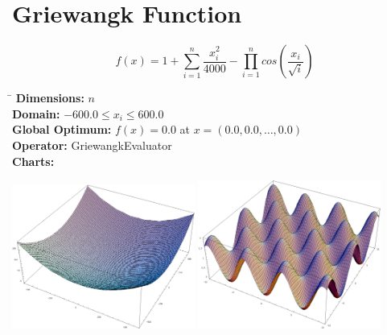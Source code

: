 \documentclass[12pt, a4paper]{article}
\begin{document}
	\newpage

	\section*{Griewangk Function}
		\begin{equation*}
			f(x) = 1 + \sum_{i=1}^n \frac{x_i^2}{4000} - \prod_{i=1}^n cos(\frac{x_i}{\sqrt i})
		\end{equation*}

		\begin{tabbing}
			\hspace{5cm}\=\kill
			\textbf{Dimensions:}     \> $n$ \\
			\textbf{Domain:}         \> $-600.0 \leq x_i \leq 600.0$ \\
			\textbf{Global Optimum:} \> $f(x) = 0.0$ at $x = (0.0, 0.0, \dots, 0.0)$ \\
			\textbf{Operator:}       \> GriewangkEvaluator \\
			\textbf{Charts:}         \> \\
		\end{tabbing}

		\begin{center}
			\includegraphics[width=0.45\textwidth]{Images/Griewangk_large}
			\hfill
			\includegraphics[width=0.45\textwidth]{Images/Griewangk_small}
		\end{center}
\end{document}
